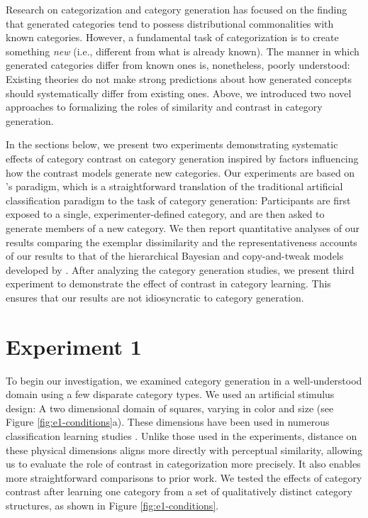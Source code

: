 \documentclass[12pt]{article}
\begin{document}
\begin{flushleft}
Research on categorization and category generation has focused on the finding
that generated categories tend to possess distributional commonalities with
known categories. However, a fundamental task of categorization is to create
something {\em new} (i.e., different from what is already known). The manner in
which generated categories differ from known ones is, nonetheless, poorly
understood: Existing theories do not make strong predictions about how generated
concepts should systematically differ from existing ones. Above, we introduced
two novel approaches to formalizing the roles of similarity and contrast in
category generation.

In the sections below, we present two experiments demonstrating systematic
effects of category contrast on category generation inspired by factors
influencing how the contrast models generate new categories. Our experiments are
based on \cite{jern2013probabilistic}'s paradigm, which is a straightforward
translation of the traditional artificial classification paradigm to the task of
category generation: Participants are first exposed to a single,
experimenter-defined category, and are then asked to generate members of a new
category. We then report quantitative analyses of our results comparing the exemplar dissimilarity
and the representativeness accounts of our results to that of the hierarchical
Bayesian and copy-and-tweak models developed by \cite{jern2013probabilistic}.
After analyzing the category generation studies, we present third experiment to
demonstrate the effect of contrast in category learning. This ensures that our
results are not idiosyncratic to category generation.

\section{Experiment 1}
To begin our investigation, we examined category generation in a well-understood domain using a few disparate category types. We used an
artificial stimulus design: A two dimensional domain of squares, varying in
color and size (see Figure \ref{fig:e1-conditions}a). These dimensions
have been used in numerous classification learning studies
\cite[e.g.,][]{conaway2016similar,conaway2016generalization,shepard1961learning,nosofsky1994comparing}.
Unlike those used in the \cite{jern2013probabilistic} experiments, distance on
these physical dimensions aligns more directly with perceptual similarity,
allowing us to evaluate the role of  contrast in categorization
more precisely. It also enables more straightforward comparisons to prior work. We tested the effects of category contrast after learning one category from a set of qualitatively distinct category structures, as shown in Figure \ref{fig:e1-conditions}.


\end{flushleft}
\end{document}
